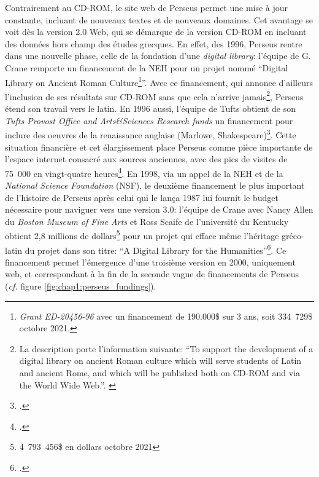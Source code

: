 Contrairement au CD-ROM, le site web de Perseus permet une mise à jour constante, incluant de nouveaux textes et de nouveaux domaines. Cet avantage se voit dès la version 2.0 Web, qui se démarque de la version CD-ROM en incluant des données hors champ des études grecques. En effet, des 1996, Perseus rentre dans une nouvelle phase, celle de la fondation d'une \textit{digital library}: l'équipe de G. Crane remporte un financement de la NEH pour un projet nommé \enquote{Digital Library on Ancient Roman Culture\footnote{\textit{Grant ED-20456-96} avec un financement de 190.000\$ sur 3 ans, soit 334~729\$ octobre 2021.}}. Avec ce financement, qui annonce d'ailleurs l'inclusion de ses résultats sur CD-ROM sans que cela n'arrive jamais\footnote{La description porte l'information suivante: \enquote{To support the development of a digital library on ancient Roman culture which will serve students of Latin and ancient Rome, and which will be published both on CD-ROM and via the World Wide Web.}. \cite{noauthor_neh_nodate}}, Perseus étend son travail vers le latin. En 1996 aussi, l'équipe de Tufts obtient de son \textit{Tufts Provost Office and Arts\&Sciences Research funds} un financement pour inclure des oeuvres de la renaissance anglaise (Marlowe, Shakespeare)\footcite{crane_perseus_1998}. Cette situation financière et cet élargissement place Perseus comme pièce importante de l'espace internet consacré aux sources anciennes, avec des pics de visites de 75~000 en vingt-quatre heures\footcite{crane_digital_1998}. En 1998, via un appel de la NEH et de la \textit{National Science Foundation} (NSF), le deuxième financement le plus important de l'histoire de Perseus après celui qui le lança 1987 lui fournit le budget nécessaire pour naviguer vers une version 3.0: l'équipe de Crane avec Nancy Allen du \textit{Boston Museum of Fine Arts} et Ross Scaife de l'université du Kentucky obtient 2,8 millions de dollars\footnote{4~793~456\$ en dollars octobre 2021} pour un projet qui efface même l'héritage gréco-latin du projet dans son titre: \enquote{A Digital Library for the Humanities}\footcite{crane_digital_1998}. Ce financement permet l'émergence d'une troisième version en 2000, uniquement web, et correspondant à la fin de la seconde vague de financements de Perseus (\textit{cf.} figure \ref{fig:chap1:perseus_fundings}).

